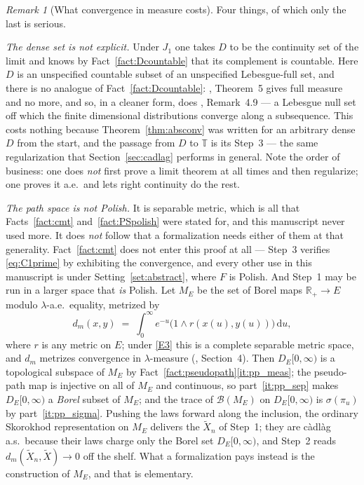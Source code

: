 \documentclass[11pt,a4paper]{article}
\theoremstyle{plain}
\theoremstyle{definition}
\theoremstyle{remark}
\newtheorem{remark}[theorem]{Remark}
\newcommand{\R}{\mathbb{R}}
\newcommand{\Rp}{\R_+}
\newcommand{\T}{\mathbb{T}}                     %
\newcommand{\Bor}{\mathcal{B}}                 %
\newcommand{\DE}{D_E[0,\infty)}
\newcommand{\dif}{\,\mathrm{d}}
\newcommand{\MZ}{\cite{MZ84}}
\newcommand{\Ku}{\cite{Kurtz91}}
\begin{document}
\begin{remark}[What convergence in measure costs]
  \label{rem:MZcost}
  Four things, of which only the last is serious.

  \emph{The dense set is not explicit.}  Under $J_1$ one takes $D$ to be the
  continuity set of the limit and knows by Fact~\ref{fact:Dcountable} that its
  complement is countable.  Here $D$ is an unspecified countable subset of an
  unspecified Lebesgue-full set, and there is no analogue of
  Fact~\ref{fact:Dcountable}: \MZ, Theorem~5 gives full measure and no more, and
  so, in a cleaner form, does \Ku, Remark~4.9 --- a Lebesgue null set off which
  the finite dimensional distributions converge along a subsequence.  This
  costs nothing because Theorem~\ref{thm:absconv} was written for an arbitrary
  dense $D$ from the start, and the passage from $D$ to $\T$ is its Step~3 --- the
  same regularization that Section~\ref{sec:cadlag} performs in general.  Note the
  order of business: one does \emph{not} first prove a limit theorem at all times
  and then regularize; one proves it a.e.\ and lets right continuity do the rest.

  \emph{The path space is not Polish.}  It is separable metric, which is all that
  Facts~\ref{fact:cmt} and~\ref{fact:PSpolish} were stated for, and this
  manuscript never used more.  It does \emph{not} follow that a formalization
  needs either of them at that generality.  Fact~\ref{fact:cmt} does not enter
  this proof at all --- Step~3 verifies \eqref{eq:C1prime} by exhibiting the
  convergence, and every other use in this manuscript is under
  Setting~\ref{set:abstract}, where $F$ is Polish.  And Step~1 may be run in a
  larger space that \emph{is} Polish.  Let $M_E$ be the set of Borel maps
  $\Rp \to E$ modulo $\lambda$-a.e.\ equality, metrized by
  \[
    d_m(x,y) \;=\; \int_0^\infty e^{-u} \bigl( 1 \wedge r(x(u),y(u)) \bigr) \dif u ,
  \]
  where $r$ is any metric on $E$; under \eqref{E3} this is a complete separable
  metric space, and $d_m$ metrizes convergence in $\lambda$-measure (\Ku,
  Section~4).  Then $\DE$ is a
  topological subspace of $M_E$ by
  Fact~\ref{fact:pseudopath}\ref{it:pp_meas}; the pseudo-path map is injective
  on all of $M_E$ and continuous, so part~\ref{it:pp_sep} makes $\DE$ a
  \emph{Borel} subset of $M_E$; and the trace of $\Bor(M_E)$ on $\DE$ is
  $\sigma(\pi_u)$ by part~\ref{it:pp_sigma}.  Pushing the laws forward along the
  inclusion, the ordinary Skorokhod representation on $M_E$ delivers the
  $\tilde X_n$ of Step~1; they are c\`adl\`ag a.s.\ because their laws charge
  only the Borel set $\DE$, and Step~2 reads $d_m(\tilde X_n, \tilde X) \to 0$
  off the shelf.  What a formalization pays instead is the construction of
  $M_E$, and that is elementary.


\end{remark}
\end{document}
